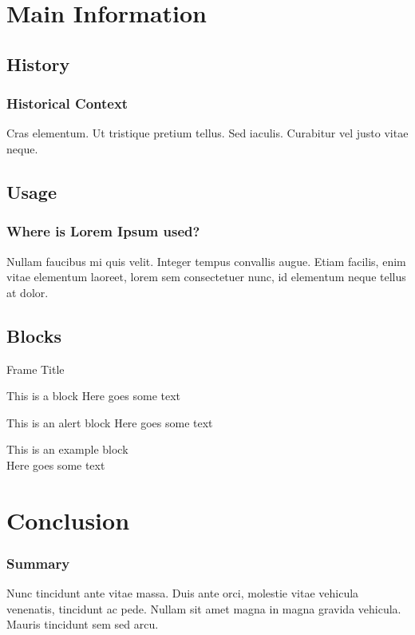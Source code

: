 \documentclass[
	11pt,
	aspectratio=169,
]{beamer}
\begin{document}
\section{Main Information}
\subsection{History}
\begin{frame}
	\frametitle{Historical Context}
	Cras elementum. Ut tristique pretium tellus. Sed iaculis. Curabitur vel justo vitae neque.
\end{frame}

\subsection{Usage}
\begin{frame}
	\frametitle{Where is Lorem Ipsum used?}
	Nullam faucibus mi quis velit. Integer tempus convallis augue. Etiam facilis, enim vitae elementum laoreet, lorem sem consectetuer nunc, id elementum neque tellus at dolor. 
\end{frame}

\subsection{Blocks}

\begin{frame}{Frame Title}
    \begin{block}{This is a block}
    Here goes some text
    \end{block}
    
    \begin{alertblock}{This is an alert block}
    Here goes some text
    \end{alertblock}
    
    \begin{examples}{This is an example block}
    \\Here goes some text
    \end{examples}
\end{frame}

\section{Conclusion}
\begin{frame}
	\frametitle{Summary}
	Nunc tincidunt ante vitae massa. Duis ante orci, molestie vitae vehicula venenatis, tincidunt ac pede. Nullam sit amet magna in magna gravida vehicula. Mauris tincidunt sem sed arcu.
\end{frame}
\end{document}

